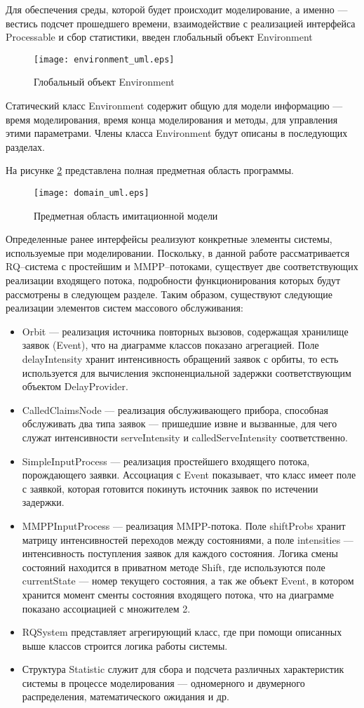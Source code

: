 Для обеспечения среды, которой будет происходит моделирование, а именно --- вестись подсчет прошедшего времени, взаимодействие с реализацией интерфейса Processable и сбор статистики, введен глобальный объект Environment
\begin{figure}[H]
	\centering
	\texttt{[image: environment\_uml.eps]}
	\caption{Глобальный объект Environment}
	\label{environment_uml}
\end{figure}

Статический класс Environment содержит общую для модели информацию --- время моделирования, время конца моделирования и методы, для управления этими параметрами. 
Члены класса Environment будут описаны в последующих разделах.

На рисунке \ref{domain_uml} представлена полная предметная область программы.
\begin{figure}[H]
	\centering
	\texttt{[image: domain\_uml.eps]}
	\caption{Предметная область имитационной модели}
	\label{domain_uml}
\end{figure}
Определенные ранее интерфейсы реализуют конкретные элементы системы, используемые при моделировании. Поскольку, в данной работе рассматривается RQ--система с простейшим и MMPP--потоками, существует две соответствующих реализации входящего потока, подробности функционирования которых будут рассмотрены в следующем разделе. Таким образом, существуют следующие реализации элементов систем массового обслуживания:
\begin{itemize}
	\item Orbit --- реализация источника повторных вызовов, содержащая хранилище заявок (Event), что на диаграмме классов показано агрегацией. Поле delayIntensity хранит интенсивность обращений заявок с орбиты, то есть используется для вычисления экспоненциальной задержки соответствующим объектом DelayProvider.
	\item CalledClaimsNode --- реализация обслуживающего прибора, способная обслуживать два типа заявок --- пришедшие извне и вызванные, для чего служат интенсивности serveIntensity и calledServeIntensity соответственно.
	\item SimpleInputProcess --- реализация простейшего входящего потока, порождающего заявки. Ассоциация с Event показывает, что класс имеет поле с заявкой, которая готовится покинуть источник заявок по истечении задержки.
	\item MMPPInputProcess --- реализация MMPP-потока. Поле shiftProbs хранит матрицу интенсивностей переходов между состояниями, а поле intensities --- интенсивность поступления заявок для каждого состояния. Логика смены состояний находится в приватном методе Shift, где используются поле currentState --- номер текущего состояния, а так же объект Event, в котором хранится момент сменты состояния входящего потока, что на диаграмме показано ассоциацией с множителем 2.
	\item RQSystem представляет агрегирующий класс, где при помощи описанных выше классов строится логика работы системы.
	\item Структура Statistic служит для сбора и подсчета различных характеристик системы в процессе моделирования --- одномерного и двумерного распределения, математического ожидания и др. 
\end{itemize}
\clearpage
